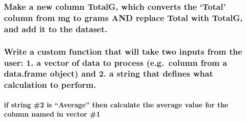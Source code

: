 \documentclass[
]{article}
\newenvironment{Shaded}{\begin{snugshade}}{\end{snugshade}}
\newcommand{\FloatTok}[1]{\textcolor[rgb]{0.00,0.00,0.81}{#1}}
\newcommand{\FunctionTok}[1]{\textcolor[rgb]{0.00,0.00,0.00}{#1}}
\newcommand{\NormalTok}[1]{#1}
\newcommand{\OtherTok}[1]{\textcolor[rgb]{0.56,0.35,0.01}{#1}}
\newcommand{\SpecialCharTok}[1]{\textcolor[rgb]{0.00,0.00,0.00}{#1}}
\begin{document}
\hypertarget{make-a-new-column-totalg-which-converts-the-total-column-from-mg-to-grams-and-replace-total-with-totalg-and-add-it-to-the-dataset.}{%
\subsubsection{Make a new column TotalG, which converts the `Total'
column from mg to grams AND replace Total with TotalG, and add it to the
dataset.}\label{make-a-new-column-totalg-which-converts-the-total-column-from-mg-to-grams-and-replace-total-with-totalg-and-add-it-to-the-dataset.}}

\begin{Shaded}
\end{Shaded}

\hypertarget{write-a-custom-function-that-will-take-two-inputs-from-the-user-1.-a-vector-of-data-to-process-e.g.-column-from-a-data.frame-object-and-2.-a-string-that-defines-what-calculation-to-perform.}{%
\subsubsection{Write a custom function that will take two inputs from
the user: 1. a vector of data to process (e.g.~column from a data.frame
object) and 2. a string that defines what calculation to
perform.}\label{write-a-custom-function-that-will-take-two-inputs-from-the-user-1.-a-vector-of-data-to-process-e.g.-column-from-a-data.frame-object-and-2.-a-string-that-defines-what-calculation-to-perform.}}

\hypertarget{if-string-2-is-average-then-calculate-the-average-value-for-the-column-named-in-vector-1}{%
\paragraph{if string \#2 is ``Average'' then calculate the average value
for the column named in vector
\#1}\label{if-string-2-is-average-then-calculate-the-average-value-for-the-column-named-in-vector-1}}
\end{document}
